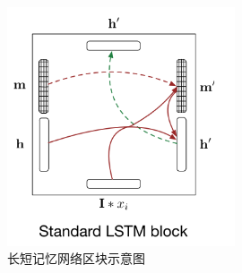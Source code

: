 \begin{figure}[h] %
   	\centering
   	\includegraphics[width=0.6\textwidth]{demo_images/lstmblock1}
   	\caption{长短记忆网络区块示意图}
   	\label{fig:lstm}
\end{figure}